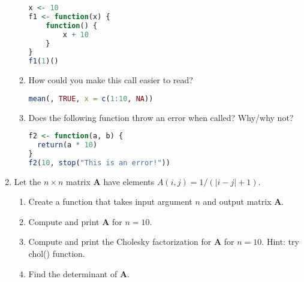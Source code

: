 \documentclass[12pt]{report}
\newcommand{\Vec}[1]{\bm{#1}}
\begin{document}
\begin{enumerate}
\begin{enumerate}[label={\alph*}]
\begin{lstlisting}[language=R]
x <- 10
f1 <- function(x) {
    function() {
        x + 10
    }
}
f1(1)()
\end{lstlisting}
	
	\item How could you make this call easier to read?
\begin{lstlisting}[language=R]
mean(, TRUE, x = c(1:10, NA))
\end{lstlisting}
	
	\item Does the following function throw an error when called?  Why/why not?

\begin{lstlisting}[language=R]
f2 <- function(a, b) {
  return(a * 10)
}
f2(10, stop("This is an error!"))
\end{lstlisting}
        
    \end{enumerate}

\item Let the $n \times n$ matrix $\Vec{A}$ have elements $A(i, j) = 1/(|i - j| + 1)$.
    \begin{enumerate}[label = {\alph*}]
        \item Create a function that takes input argument $n$ and output matrix $\Vec{A}$.
        \item Compute and print $\Vec{A}$ for $n = 10$.
        \item Compute and print the Cholesky factorization for $\Vec{A}$ for $n = 10$.  Hint: try chol() function.
        \item Find the determinant of $\Vec{A}$.
    \end{enumerate}
 \end{enumerate}
\end{document}
